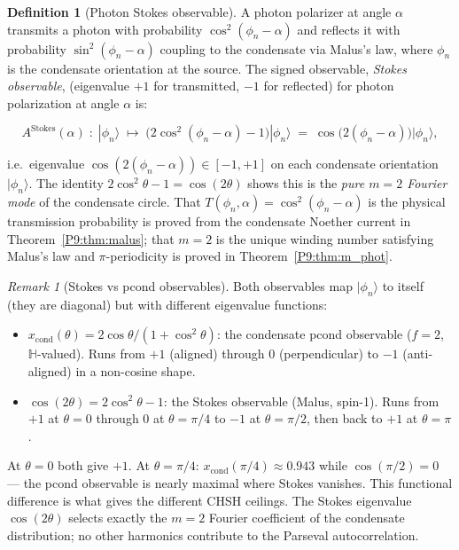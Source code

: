 \documentclass[11pt,a4paper]{article}
\theoremstyle{definition}
\newtheorem{definition}[theorem]{Definition}
\theoremstyle{remark}
\newtheorem{remark}[theorem]{Remark}
\newcommand{\HH}{\mathbb{H}}
\newcommand{\xcond}{x_{\mathrm{cond}}}
\begin{document}
\begin{definition}[Photon Stokes observable]
\label{P9:def:stokes}
A photon polarizer at angle $\alpha$ transmits a photon with probability
$\cos^2(\phi_n-\alpha)$ and reflects it with probability $\sin^2(\phi_n-\alpha)$ coupling to the condensate via Malus's law, where $\phi_n$ is the condensate orientation at the source. The signed observable, \emph{Stokes observable}, (eigenvalue $+1$ for transmitted, $-1$ for reflected) for photon polarization at angle $\alpha$ is:

\begin{equation}
  A^\mathrm{Stokes}(\alpha) \;:\; |\phi_n\rangle
  \;\longmapsto\; \bigl(2\cos^2(\phi_n-\alpha)-1\bigr)|\phi_n\rangle
  \;=\; \cos\bigl(2(\phi_n-\alpha)\bigr)|\phi_n\rangle,
  \label{P9:eq:stokes_op}
\end{equation}

i.e.\ eigenvalue $\cos(2(\phi_n-\alpha))\in[-1,+1]$ on each condensate
orientation $|\phi_n\rangle$.
The identity $2\cos^2\theta-1=\cos(2\theta)$ shows this is the
\emph{pure $m=2$ Fourier mode} of the condensate circle.
That $T(\phi_n,\alpha)=\cos^2(\phi_n-\alpha)$ is the physical transmission
probability is proved from the condensate Noether current in
Theorem~\ref{P9:thm:malus}; that $m=2$ is the unique winding number
satisfying Malus's law and $\pi$-periodicity is proved in
Theorem~\ref{P9:thm:m_phot}.

\end{definition}
 
\begin{remark}[Stokes vs pcond observables]
\label{P9:rem:stokes_vs_pcond}
Both observables map $|\phi_n\rangle$ to itself (they are diagonal)
but with different eigenvalue functions:
\begin{itemize}[noitemsep]
\item $\xcond(\theta) = 2\cos\theta/(1+\cos^2\theta)$: the condensate
  pcond observable ($f=2$, $\HH$-valued). Runs from $+1$ (aligned)
  through 0 (perpendicular) to $-1$ (anti-aligned) in a non-cosine shape.
\item $\cos(2\theta) = 2\cos^2\theta-1$: the Stokes observable (Malus,
  spin-1). Runs from $+1$ at $\theta=0$ through 0 at $\theta=\pi/4$
  to $-1$ at $\theta=\pi/2$, then back to $+1$ at $\theta=\pi$.
\end{itemize}
At $\theta=0$ both give $+1$.
At $\theta=\pi/4$: $\xcond(\pi/4)\approx0.943$ while $\cos(\pi/2)=0$ ---
the pcond observable is nearly maximal where Stokes vanishes.
This functional difference is what gives the different CHSH ceilings.
The Stokes eigenvalue $\cos(2\theta)$ selects exactly the $m=2$ Fourier
coefficient of the condensate distribution; no other harmonics contribute
to the Parseval autocorrelation.
\end{remark}
 
\end{document}
